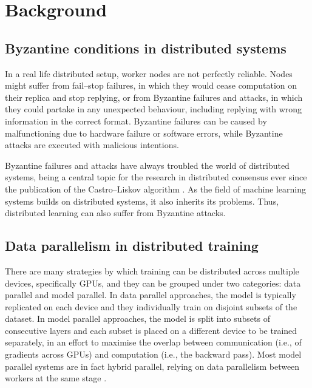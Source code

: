 \documentclass{article}
\begin{document}
\section{Background}

\subsection{Byzantine conditions in distributed systems}
In a real life distributed setup, worker nodes are not perfectly reliable. Nodes might suffer from fail--stop failures, in which they would cease computation on their replica and stop replying, or from Byzantine failures and attacks, in which they could partake in any unexpected behaviour, including replying with wrong information in the correct format. Byzantine failures can be caused by malfunctioning due to hardware failure or software errors, while Byzantine attacks are executed with malicious intentions.

Byzantine failures and attacks have always troubled the world of distributed systems, being a central topic for the research in distributed consensus ever since the publication of the Castro--Liskov algorithm \citep{castro1999practical}. As the field of machine learning systems builds on distributed systems, it also inherits its problems. Thus, distributed learning can also suffer from Byzantine attacks.


\subsection{Data parallelism in distributed training}
There are many strategies by which training can be distributed across multiple devices, specifically GPUs, and they can be grouped under two categories: data parallel and model parallel. In data parallel approaches, the model is typically replicated on each device and they individually train on disjoint subsets of the dataset. In model parallel approaches, the model is split into subsets of consecutive layers and each subset is placed on a different device to be trained separately, in an effort to maximise the overlap between communication (i.e., of gradients across GPUs) and computation (i.e., the backward pass). Most model parallel systems are in fact hybrid parallel, relying on data parallelism between workers at the same stage \citep{rajbhandari2020zero, narayanan2021efficient}.
\end{document}
